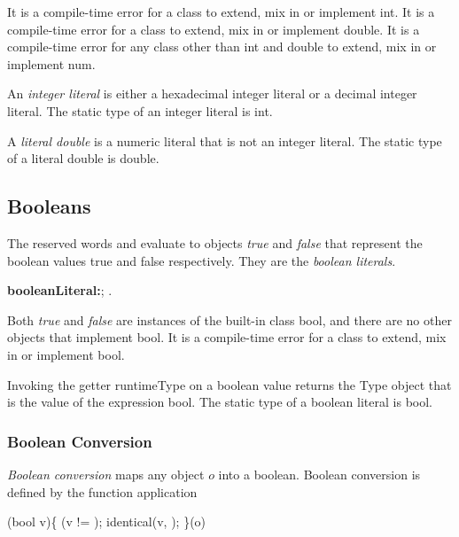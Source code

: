 \documentclass{article}
\newcommand{\code}[1]{{\sf #1}}
\begin{document}
\LMHash{}
It is a compile-time error for a class to extend, mix in or implement \code{int}.
It is a compile-time error for a class to extend, mix in or implement \code{double}.
It is a compile-time error for any class other than \code{int} and \code{double} to extend, mix in or implement \code{num}.

\LMHash{}
An {\em integer literal} is either a hexadecimal integer literal or a  decimal integer literal.
The static type of an integer literal is \code{int}.

\LMHash{}
A {\em literal double} is a numeric literal that is not an integer literal. The static type of a literal double is \code{double}.

\subsection{Booleans}

\LMHash{}
The reserved words \TRUE{} and \FALSE{} evaluate to objects {\em true} and {\em false} that represent the boolean values true and false respectively.
They are the {\em boolean literals}.

\begin{grammar}
{\bf booleanLiteral:}\TRUE{};
        \FALSE{}
    .
\end{grammar}

\LMHash{}
Both {\em true} and {\em false} are instances of the built-in class \code{bool},
and there are no other objects that implement \code{bool}.
It is a compile-time error for a class to extend, mix in or implement \code{bool}.

\LMHash{}
Invoking the getter \code{runtimeType} on a boolean value returns the \code{Type} object that is the value of the expression \code{bool}. The static type of a boolean literal is \code{bool}.

\subsubsection{Boolean Conversion}

\LMHash{}
{\em Boolean conversion} maps any object $o$ into a boolean. Boolean conversion is  defined by the function application

\begin{dartCode}
(bool v)\{
         \ASSERT{}(v != \NULL{});
         \RETURN{} identical(v, \TRUE{});
\}(o)
\end{dartCode}
\end{document}
